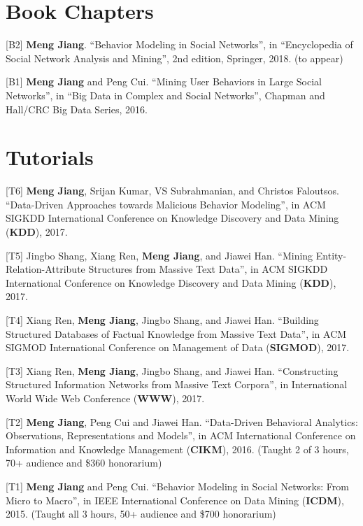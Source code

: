 \documentclass[margin, 9pt]{res}
\begin{document}
\begin{resume}
\section{Book Chapters}

[B2] \textbf{Meng Jiang}. ``Behavior Modeling in Social Networks'', in ``Encyclopedia of Social Network Analysis and Mining'', 2nd edition, Springer, 2018. (to appear)

[B1] \textbf{Meng Jiang} and Peng Cui. ``Mining User Behaviors in Large Social Networks'', in ``Big Data in Complex and Social Networks'', Chapman and Hall/CRC Big Data Series, 2016.


\section{Tutorials}

[T6] \textbf{Meng Jiang}, Srijan Kumar, VS Subrahmanian, and Christos Faloutsos. ``Data-Driven Approaches towards Malicious Behavior Modeling'', in ACM SIGKDD International Conference on Knowledge Discovery and Data Mining (\textbf{KDD}), 2017.

[T5] Jingbo Shang, Xiang Ren, \textbf{Meng Jiang}, and Jiawei Han. ``Mining Entity-Relation-Attribute Structures from Massive Text Data'', in ACM SIGKDD International Conference on Knowledge Discovery and Data Mining (\textbf{KDD}), 2017.

[T4] Xiang Ren, \textbf{Meng Jiang}, Jingbo Shang, and Jiawei Han. ``Building Structured Databases of Factual Knowledge from Massive Text Data'', in ACM SIGMOD International Conference on Management of Data (\textbf{SIGMOD}), 2017.

[T3] Xiang Ren, \textbf{Meng Jiang}, Jingbo Shang, and Jiawei Han. ``Constructing Structured Information Networks from Massive Text Corpora'', in International World Wide Web Conference (\textbf{WWW}), 2017.

[T2] \textbf{Meng Jiang}, Peng Cui and Jiawei Han. ``Data-Driven Behavioral Analytics: Observations, Representations and Models'', in ACM International Conference on Information and Knowledge Management (\textbf{CIKM}), 2016. (Taught 2 of 3 hours, 70+ audience and \$360 honorarium)

[T1] \textbf{Meng Jiang} and Peng Cui. ``Behavior Modeling in Social Networks: From Micro to Macro'', in IEEE International Conference on Data Mining (\textbf{ICDM}), 2015. (Taught all 3 hours, 50+ audience and \$700 honorarium)


\end{resume}
\end{document}
